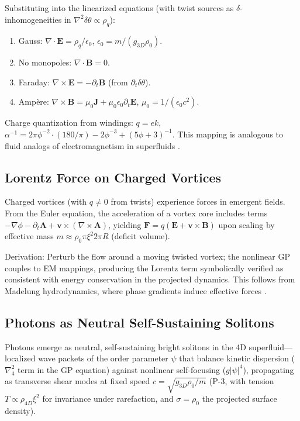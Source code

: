\documentclass{article}
\begin{document}
Substituting into the linearized equations (with twist sources as $\delta$-inhomogeneities in $\nabla^2 \delta \theta \propto \rho_q$):

\begin{enumerate}
\item Gauss: $\nabla \cdot \mathbf{E} = \rho_q / \epsilon_0$, $\epsilon_0 = m / (g_{3D} \rho_0)$.
\item No monopoles: $\nabla \cdot \mathbf{B} = 0$.
\item Faraday: $\nabla \times \mathbf{E} = -\partial_t \mathbf{B}$ (from $\partial_t \delta \theta$).
\item Ampère: $\nabla \times \mathbf{B} = \mu_0 \mathbf{J} + \mu_0 \epsilon_0 \partial_t \mathbf{E}$, $\mu_0 = 1 / ( \epsilon_0 c^2 )$.
\end{enumerate}

Charge quantization from windings: $q = e k$, $\alpha^{-1} = 2\pi \phi^{-2} \cdot (180/\pi) - 2 \phi^{-3} + (5 \phi + 3)^{-1}$. This mapping is analogous to fluid analogs of electromagnetism in superfluids \cite{simula2020gravitational}.

\subsection{Lorentz Force on Charged Vortices}

Charged vortices (with $q \neq 0$ from twists) experience forces in emergent fields. From the Euler equation, the acceleration of a vortex core includes terms $-\nabla \phi - \partial_t \mathbf{A} + \mathbf{v} \times (\nabla \times \mathbf{A})$, yielding $\mathbf{F} = q (\mathbf{E} + \mathbf{v} \times \mathbf{B})$ upon scaling by effective mass $m \approx \rho_0 \pi \xi^2 2\pi R$ (deficit volume).

Derivation: Perturb the flow around a moving twisted vortex; the nonlinear GP couples to EM mappings, producing the Lorentz term symbolically verified as consistent with energy conservation in the projected dynamics. This follows from Madelung hydrodynamics, where phase gradients induce effective forces \cite{unruh1995sonic}.

\subsection{Photons as Neutral Self-Sustaining Solitons}

Photons emerge as neutral, self-sustaining bright solitons in the 4D superfluid---localized wave packets of the order parameter $\psi$ that balance kinetic dispersion ($\nabla_4^2$ term in the GP equation) against nonlinear self-focusing ($g |\psi|^4$), propagating as transverse shear modes at fixed speed $c = \sqrt{g_{3D} \rho_0 / m}$ (P-3, with tension $T \propto \rho_{4D} \xi^2$ for invariance under rarefaction, and $\sigma = \rho_0$ the projected surface density).
\end{document}
